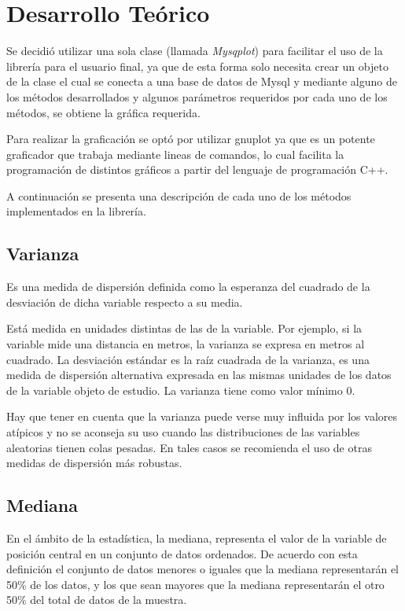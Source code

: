 \documentclass[a4paper]{article}
\begin{document}
\section{Desarrollo Teórico} %

Se decidió utilizar una sola clase (llamada \textit{Mysqplot}) para facilitar el uso de la librería para el usuario final, ya que de esta forma solo necesita crear un objeto de la clase el cual se conecta a una base de datos de Mysql y mediante alguno de los métodos desarrollados y algunos parámetros requeridos por cada uno de los métodos, se obtiene la gráfica requerida.

Para realizar la graficación se optó por utilizar gnuplot ya que es un potente graficador que trabaja mediante lineas de comandos, lo cual facilita la programación de distintos gráficos a partir del lenguaje de programación C++.

A continuación se presenta una descripción de cada uno de los métodos implementados en la librería.


\subsection{Varianza}
Es una medida de dispersión definida como la esperanza del cuadrado de la desviación de dicha variable respecto a su media.

Está medida en unidades distintas de las de la variable. Por ejemplo, si la variable mide una distancia en metros, la varianza se expresa en metros al cuadrado. La desviación estándar es la raíz cuadrada de la varianza, es una medida de dispersión alternativa expresada en las mismas unidades de los datos de la variable objeto de estudio. La varianza tiene como valor mínimo 0.

Hay que tener en cuenta que la varianza puede verse muy influida por los valores atípicos y no se aconseja su uso cuando las distribuciones de las variables aleatorias tienen colas pesadas. En tales casos se recomienda el uso de otras medidas de dispersión más robustas.

\subsection{Mediana}
En el ámbito de la estadística, la mediana, representa el valor de la variable de posición central en un conjunto de datos ordenados. De acuerdo con esta definición el conjunto de datos menores o iguales que la mediana representarán el 50\% de los datos, y los que sean mayores que la mediana representarán el otro 50\% del total de datos de la muestra.
\end{document}

